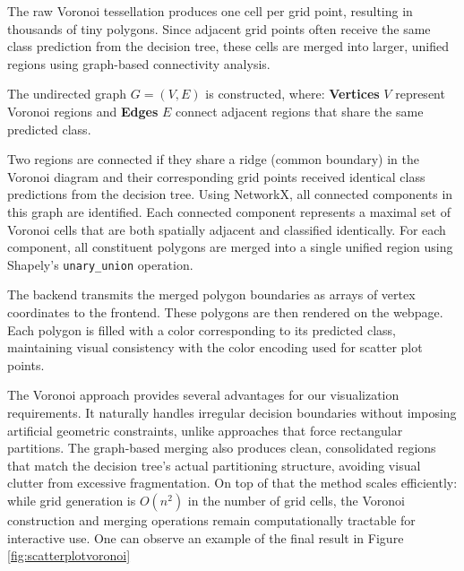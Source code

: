 The raw Voronoi tessellation produces one cell per grid point, resulting in thousands of tiny polygons. Since adjacent grid points often receive the same class prediction from the decision tree, these cells are merged into larger, unified regions using graph-based connectivity analysis.

The undirected graph $G = (V, E)$ is constructed, where: \textbf{Vertices} $V$ represent Voronoi regions and \textbf{Edges} $E$ connect adjacent regions that share the same predicted class.

Two regions are connected if they share a ridge (common boundary) in the Voronoi diagram and their corresponding grid points received identical class predictions from the decision tree.
Using NetworkX, all connected components in this graph are identified. Each connected component represents a maximal set of Voronoi cells that are both spatially adjacent and classified identically. For each component, all constituent polygons are merged into a single unified region using Shapely's \texttt{unary\_union} operation.

The backend transmits the merged polygon boundaries as arrays of vertex coordinates to the frontend. These polygons are then rendered on the webpage.
Each polygon is filled with a color corresponding to its predicted class, maintaining visual consistency with the color encoding used for scatter plot points. 

The Voronoi approach provides several advantages for our visualization requirements. It naturally handles irregular decision boundaries without imposing artificial geometric constraints, unlike approaches that force rectangular partitions. The graph-based merging also produces clean, consolidated regions that match the decision tree's actual partitioning structure, avoiding visual clutter from excessive fragmentation. On top of that the method scales efficiently: while grid generation is $O(n^2)$ in the number of grid cells, the Voronoi construction and merging operations remain computationally tractable for interactive use. One can observe an example of the final result in Figure \ref{fig:scatterplotvoronoi}

